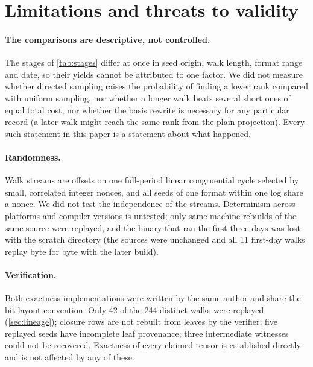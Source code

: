 \section{Limitations and threats to validity}\label{sec:limits}

\paragraph{The comparisons are descriptive, not controlled.}
The stages of \cref{tab:stages} differ at once in seed origin, walk length, format range and date, so their yields cannot be attributed to one factor. We did not measure whether directed sampling raises the probability of finding a lower rank compared with uniform sampling, nor whether a longer walk beats several short ones of equal total cost, nor whether the basis rewrite is necessary for any particular record (a later walk might reach the same rank from the plain projection). Every such statement in this paper is a statement about what happened.

\paragraph{Randomness.}
Walk streams are offsets on one full-period linear congruential cycle selected by small, correlated integer nonces, and all seeds of one format within one log share a nonce. We did not test the independence of the streams. Determinism across platforms and compiler versions is untested; only same-machine rebuilds of the same source were replayed, and the binary that ran the first three days was lost with the scratch directory (the sources were unchanged and all 11 first-day walks replay byte for byte with the later build).

\paragraph{Verification.}
Both exactness implementations were written by the same author and share the bit-layout convention. Only 42 of the 244 distinct walks were replayed (\cref{sec:lineage}); closure rows are not rebuilt from leaves by the verifier; five replayed seeds have incomplete leaf provenance; three intermediate witnesses could not be recovered. Exactness of every claimed tensor is established directly and is not affected by any of these.

